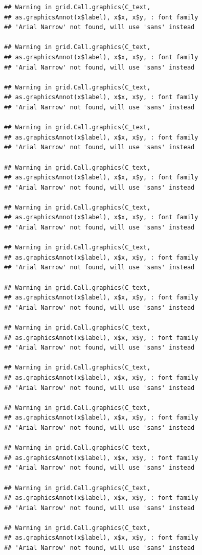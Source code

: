 \documentclass[]{krantz}
\begin{document}
\begin{verbatim}
## Warning in grid.Call.graphics(C_text,
## as.graphicsAnnot(x$label), x$x, x$y, : font family
## 'Arial Narrow' not found, will use 'sans' instead

## Warning in grid.Call.graphics(C_text,
## as.graphicsAnnot(x$label), x$x, x$y, : font family
## 'Arial Narrow' not found, will use 'sans' instead

## Warning in grid.Call.graphics(C_text,
## as.graphicsAnnot(x$label), x$x, x$y, : font family
## 'Arial Narrow' not found, will use 'sans' instead

## Warning in grid.Call.graphics(C_text,
## as.graphicsAnnot(x$label), x$x, x$y, : font family
## 'Arial Narrow' not found, will use 'sans' instead

## Warning in grid.Call.graphics(C_text,
## as.graphicsAnnot(x$label), x$x, x$y, : font family
## 'Arial Narrow' not found, will use 'sans' instead

## Warning in grid.Call.graphics(C_text,
## as.graphicsAnnot(x$label), x$x, x$y, : font family
## 'Arial Narrow' not found, will use 'sans' instead

## Warning in grid.Call.graphics(C_text,
## as.graphicsAnnot(x$label), x$x, x$y, : font family
## 'Arial Narrow' not found, will use 'sans' instead

## Warning in grid.Call.graphics(C_text,
## as.graphicsAnnot(x$label), x$x, x$y, : font family
## 'Arial Narrow' not found, will use 'sans' instead

## Warning in grid.Call.graphics(C_text,
## as.graphicsAnnot(x$label), x$x, x$y, : font family
## 'Arial Narrow' not found, will use 'sans' instead

## Warning in grid.Call.graphics(C_text,
## as.graphicsAnnot(x$label), x$x, x$y, : font family
## 'Arial Narrow' not found, will use 'sans' instead

## Warning in grid.Call.graphics(C_text,
## as.graphicsAnnot(x$label), x$x, x$y, : font family
## 'Arial Narrow' not found, will use 'sans' instead

## Warning in grid.Call.graphics(C_text,
## as.graphicsAnnot(x$label), x$x, x$y, : font family
## 'Arial Narrow' not found, will use 'sans' instead

## Warning in grid.Call.graphics(C_text,
## as.graphicsAnnot(x$label), x$x, x$y, : font family
## 'Arial Narrow' not found, will use 'sans' instead

## Warning in grid.Call.graphics(C_text,
## as.graphicsAnnot(x$label), x$x, x$y, : font family
## 'Arial Narrow' not found, will use 'sans' instead


\end{verbatim}
\end{document}
